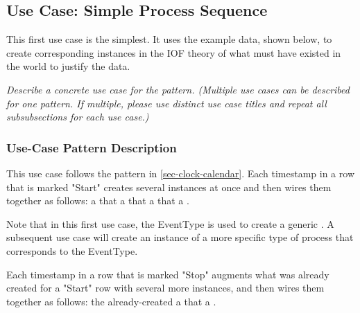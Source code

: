 \subsection*{Use Case: Simple Process Sequence}\label{SimpleProcessSequence}
This first use case is the simplest. It uses the example data, shown below, to create corresponding instances in the IOF theory of what must have existed in the world to justify the data.

 \textit{ 
Describe a concrete use case for the pattern. (Multiple use cases can be described for one pattern. If multiple, please use distinct use case titles and repeat all subsubsections for each use case.)
  }

\newcommand{\ti}{\cname{bfo}{TemporalInstant }}

\subsubsection*{Use-Case Pattern Description}
This use case follows the pattern in \ref{sec-clock-calendar}.
Each timestamp in a row that is marked "Start" creates several instances at once and then wires them together as follows:
a  that  a \ti that  a  that  a .

Note that in this first use case, the EventType is used to create a generic . A subsequent use case will create an instance of a more specific type of process that corresponds to the EventType.

Each timestamp in a row that is marked "Stop" augments what was already created for a "Start" row with several more instances, and then wires them together as follows:
the already-created   a  that  a .



